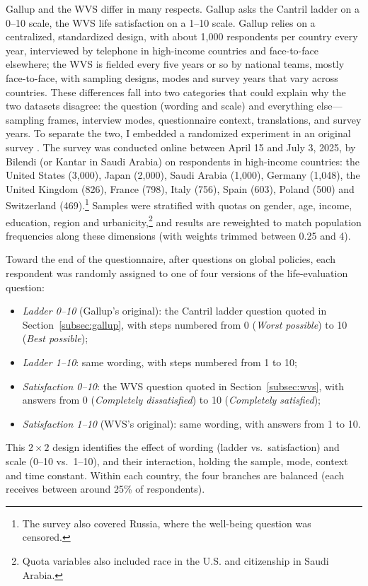 \documentclass[12pt]{article}
\begin{document}
Gallup and the WVS differ in many respects. Gallup asks the Cantril ladder on a 0--10 scale, the WVS life satisfaction on a 1--10 scale. Gallup relies on a centralized, standardized design, with about 1,000 respondents per country every year, interviewed by telephone in high-income countries and face-to-face elsewhere; the WVS is fielded every five years or so by national teams, mostly face-to-face, with sampling designs, modes and survey years that vary across countries. These differences fall into two categories that could explain why the two datasets disagree: the question (wording and scale) and everything else---sampling frames, interview modes, questionnaire context, translations, and survey years. To separate the two, I embedded a randomized experiment in an original survey \citep{fabre_public_2025}. The survey was conducted online between April 15 and July 3, 2025, by Bilendi (or Kantar in Saudi Arabia) on \nFabre respondents in \nFabreCountries high-income countries: the United States (3,000), Japan (2,000), Saudi Arabia (1,000), Germany (1,048), the United Kingdom (826), France (798), Italy (756), Spain (603), Poland (500) and Switzerland (469).\footnote{The survey also covered Russia, where the well-being question was censored.} Samples were stratified with quotas on gender, age, income, education, region and urbanicity,\footnote{Quota variables also included race in the U.S. and citizenship in Saudi Arabia.} and results are reweighted to match population frequencies along these dimensions (with weights trimmed between 0.25 and 4). %

Toward the end of the questionnaire, after questions on global policies, each respondent was randomly assigned to one of four versions of the life-evaluation question:
\begin{itemize}
    \item \textit{Ladder 0--10} (Gallup's original): the Cantril ladder question quoted in Section~\ref{subsec:gallup}, with steps numbered from 0 (\textit{Worst possible}) to 10 (\textit{Best possible});
    \item \textit{Ladder 1--10}: same wording, with steps numbered from 1 to 10;
    \item \textit{Satisfaction 0--10}: the WVS question quoted in Section~\ref{subsec:wvs}, with answers from 0 (\textit{Completely dissatisfied}) to 10 (\textit{Completely satisfied});
    \item \textit{Satisfaction 1--10} (WVS's original): same wording, with answers from 1 to 10.
\end{itemize}
This $2 \times 2$ design identifies the effect of wording (ladder vs.\ satisfaction) and scale (0--10 vs.\ 1--10), and their interaction, holding the sample, mode, context and time constant. Within each country, the four branches are balanced (each receives between around 25\% %
of respondents).
\end{document}
